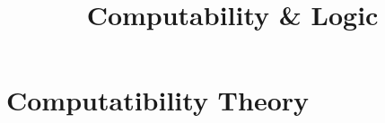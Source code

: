 \documentclass[10pt,twoside,twocolumn]{article}
\begin{document}
\title{Computability \& Logic}
\date{}
\maketitle

\part{Computatibility Theory}



\end{document}
